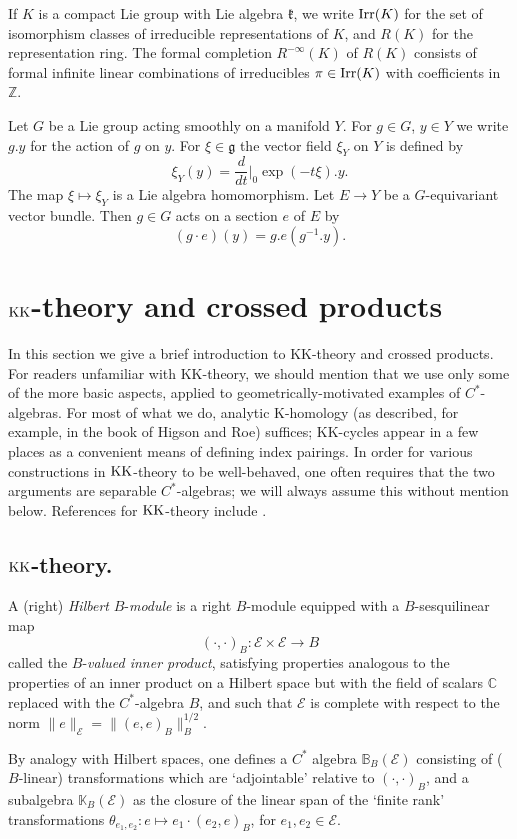 \documentclass[11pt,reqno]{amsart}
\theoremstyle{definition}
\theoremstyle{remark}
\newcommand{\tn}[1]{\textnormal{#1}}
\def\g{\ensuremath{\mathfrak{g}}}
\def\k{\ensuremath{\mathfrak{k}}}
\def\E{\ensuremath{\mathcal{E}}}
\def\bC{\ensuremath{\mathbb{C}}}
\def\bZ{\ensuremath{\mathbb{Z}}}
\def\bB{\ensuremath{\mathbb{B}}}
\def\bK{\ensuremath{\mathbb{K}}}
\def\KK{\ensuremath{\textnormal{KK}}}
\def\Irr{\ensuremath{\tn{Irr}}}
\begin{document}
If $K$ is a compact Lie group with Lie algebra $\k$, we write $\Irr(K)$ for the set of isomorphism classes of irreducible representations of $K$, and $R(K)$ for the representation ring.  The formal completion $R^{-\infty}(K)$ of $R(K)$ consists of formal infinite linear combinations of irreducibles $\pi \in \Irr(K)$ with coefficients in $\bZ$.

Let $G$ be a Lie group acting smoothly on a manifold $Y$.  For $g \in G$, $y \in Y$ we write $g.y$ for the action of $g$ on $y$.  For $\xi \in \g$ the vector field $\xi_Y$ on $Y$ is defined by
\[ \xi_Y(y)=\frac{d}{dt}\bigg|_0\exp(-t\xi).y.\]
The map $\xi \mapsto \xi_Y$ is a Lie algebra homomorphism.  Let $E \rightarrow Y$ be a $G$-equivariant vector bundle.  Then $g \in G$ acts on a section $e$ of $E$ by
\[ (g \cdot e)(y)=g.e(g^{-1}.y).\]

\section{$\KK$-theory and crossed products} \label{sec:KHomologyPrelim}
In this section we give a brief introduction to KK-theory and crossed products.  For readers unfamiliar with KK-theory, we should mention that we use only some of the more basic aspects, applied to geometrically-motivated examples of $C^\ast$-algebras.  For most of what we do, analytic K-homology (as described, for example, in the book of Higson and Roe\cite{HigsonRoe}) suffices; KK-cycles appear in a few places as a convenient means of defining index pairings.  In order for various constructions in $\KK$-theory to be well-behaved, one often requires that the two arguments are separable $C^\ast$-algebras; we will always assume this without mention below.  References for $\KK$-theory include \cite{Blackadar, KasparovNovikov, HigsonPrimer}. 

\subsection{$\KK$-theory.}
A (right) \emph{Hilbert} $B$-\emph{module} is a right $B$-module equipped with a $B$-sesquilinear map
\[ (\cdot,\cdot)_B \colon \E \times \E \rightarrow B \] 
called the $B$-\emph{valued inner product}, satisfying properties analogous to the properties of an inner product on a Hilbert space but with the field of scalars $\bC$ replaced with the $C^\ast$-algebra $B$, and such that $\E$ is complete with respect to the norm $\|e\|_{\E}=\|(e,e)_B\|_B^{1/2}$. 

By analogy with Hilbert spaces, one defines a $C^\ast$ algebra $\bB_B(\E)$ consisting of ($B$-linear) transformations which are `adjointable' relative to $(\cdot,\cdot)_B$, and a subalgebra $\bK_B(\E)$ as the closure of the linear span of the `finite rank' transformations $\theta_{e_1,e_2}\colon e \mapsto e_1\cdot (e_2,e)_B$, for $e_1,e_2 \in \E$.
\end{document}
